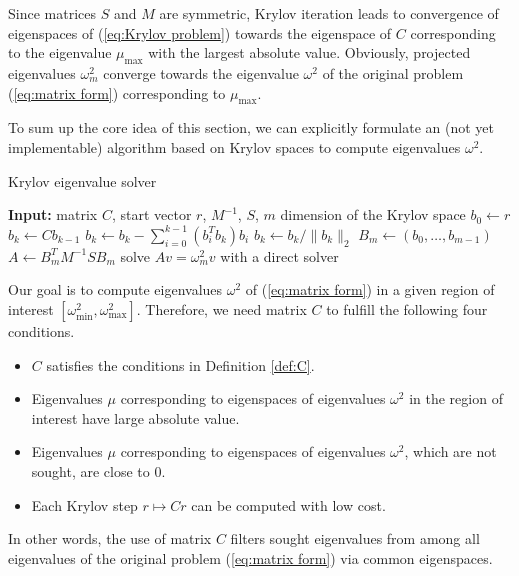\documentclass[a4paper,11pt,bibliography=totoc,listof=totoc,headinclude=true,cleardoublepage=empty,oneside]{scrbook}
\renewcommand{\eqref}[1]{(\ref{#1})}
\begin{document}
Since matrices $S$ and $M$ are symmetric, Krylov iteration leads to convergence of eigen\-spaces of \eqref{eq:Krylov problem} towards the eigenspace of $C$ corresponding to the eigenvalue $\mu_{\max}$ with the largest absolute value. Obviously, projected eigenvalues $\omega_m^2$ converge towards the eigenvalue $\omega^2$ of the original problem \eqref{eq:matrix form} corresponding to $\mu_{\max}$.

To sum up the core idea of this section, we can explicitly formulate an (not yet implementable) algorithm based on Krylov spaces to compute eigenvalues $\omega^2$.

\begin{algorithm}[H]
\caption{Krylov eigenvalue solver}\label{alg:Krylov base}
    \begin{algorithmic}
        \State \textbf{Input:} matrix $C$, start vector $r$, $M^{-1}$, $S$, $m$ dimension of the Krylov space
        \State $b_0 \gets r$
            \State $b_k \gets Cb_{k-1}$ 
            \State $b_{k} \gets b_k - \sum_{i=0}^{k-1} (b_i^T b_k) b_i$ 
            \State $ b_k \gets b_{k}/\|b_{k}\|_2 $
        \EndFor
        \State $B_m \gets (b_0, \dots, b_{m-1})$ 
        \State $A \gets B_m^T M^{-1}S B_m$
        \State solve $Av = \omega_m^2 v$ with a direct solver
    \end{algorithmic}
\end{algorithm}

Our goal is to compute eigenvalues $\omega^2$ of \eqref{eq:matrix form} in a given region of interest $\left[\omega_{\min}^2, \omega_{\max}^2\right]$. Therefore, we need matrix $C$ to fulfill the following four conditions.
\begin{itemize}
    \item $C$ satisfies the conditions in Definition \ref{def:C}.
    \item Eigenvalues $\mu$ corresponding to eigenspaces of eigenvalues $\omega^2$ in the region of interest have large absolute value.
    \item Eigenvalues $\mu$ corresponding to eigenspaces of eigenvalues $\omega^2$, which are not sought, are close to 0. 
    \item Each Krylov step $r \mapsto Cr$ can be computed with low cost.
\end{itemize}
In other words, the use of matrix $C$ filters sought eigenvalues from among all eigenvalues of the original problem \eqref{eq:matrix form} via common eigenspaces.
\end{document}
